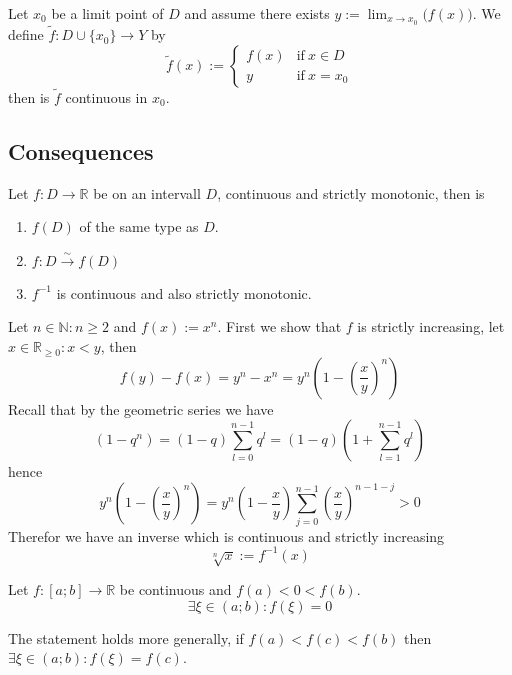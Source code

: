 \begin{proposition}
   Let \(x_0\) be a limit point of \(D\) and assume there exists \(y := \lim_{x \to x_0}\big(f(x)\big)\).
   We define \(\tilde{f}: D \cup \{x_0\} \to Y\) by
   \[\tilde{f}(x) := \begin{cases}f(x) & \text{if}~x \in D\\ y & \text{if}~x = x_0\end{cases}\]
   then is \(\tilde{f}\) continuous in \(x_0\).
\end{proposition}

\subsection{Consequences}
\begin{theorem}
   Let \(f: D \to \mathbb{R}\) be on an intervall \(D\), continuous and strictly monotonic, then is
   \begin{enumerate}[label=\roman*, align=Center]
      \item \(f(D)\) of the same type as \(D\).
      \item \(f:D \xrightarrow{\sim} f(D)\)
      \item \(f^{-1}\) is continuous and also strictly monotonic.
   \end{enumerate}
\end{theorem}
\begin{example}
   Let \(n \in \mathbb{N}: n \geq 2\) and \(f(x) := x^n\).
   First we show that \(f\) is strictly increasing, let \(x \in \mathbb{R}_{\geq 0}: x < y\), then
   \[f(y) - f(x) = y^n - x^n = y^n \left(1 - \left(\frac{x}{y}\right)^n\right)\]
   Recall that by the geometric series we have
   \[(1- q^n) = (1-q) \sum_{l=0}^{n-1} q^l = (1-q)\left(1 + \sum_{l=1}^{n-1} q^l\right)\]
   hence
   \[y^n \left(1 - \left(\frac{x}{y}\right)^n\right) = y^n \left(1 - \frac{x}{y}\right) \sum_{j=0}^{n-1} \left(\frac{x}{y}\right)^{n-1-j} > 0\]
   Therefor we have an inverse which is continuous and strictly increasing
   \[\sqrt[n]{x} := f^{-1}(x)\]
\end{example}

\begin{theorem}\label{thm:intmd_value}
   Let \(f: [a; b] \to \mathbb{R}\) be continuous and \(f(a) < 0 < f(b)\).
   \[\exists \xi \in (a;b): f(\xi) = 0\]
\end{theorem}
\begin{remark}[Tips]
   The statement holds more generally, if \(f(a) < f(c) < f(b)\) then \(\exists \xi \in (a;b): f(\xi) = f(c)\).
\end{remark}

